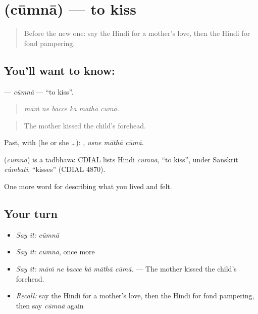 \section[\texorpdfstring{\hi{चूमना} (cūmnā)}{चूमना (cūmnā)}]{ (cūmnā) — to kiss}

\label{lesson:HI-C459-cumna}



\begin{quote}
Before the new one: say the Hindi for a mother's love, then the Hindi for fond pampering.
\end{quote}

\subsection*{You'll want to know: }
\textbf{} — \emph{cūmnā} — \textquotedblleft{}to kiss\textquotedblright{}.

\begin{quote}
     
\end{quote}

\begin{quote}
\emph{māṁ ne bacce kā māthā cūmā.}
\end{quote}

\begin{quote}
The mother kissed the child's forehead.
\end{quote}

Past, with  (he or she …):   , \emph{usne māthā cūmā}.

\begin{cousinweb}
\textbf{} (\emph{cūmnā}) is a tadbhava: CDIAL lists Hindi \emph{cūmnā}, \textquotedblleft{}to kiss\textquotedblright{}, under Sanskrit \emph{cúmbati}, \textquotedblleft{}kisses\textquotedblright{} (CDIAL 4870).
\end{cousinweb}

\begin{grammarlens}[title={What you've built}]
One more word for describing what you lived and felt.
\end{grammarlens}

\subsection*{Your turn}
\begin{itemize}
\raggedright
  \item \emph{Say it:} \emph{cūmnā}
  \item \emph{Say it:} \emph{cūmnā}, once more
  \item \emph{Say it:} \emph{māṁ ne bacce kā māthā cūmā.} — The mother kissed the child's forehead.
  \item \emph{Recall:} say the Hindi for a mother's love, then the Hindi for fond pampering, then say \emph{cūmnā} again
\end{itemize}


